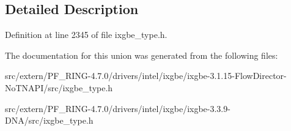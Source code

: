 \subsection{Detailed Description}


Definition at line 2345 of file ixgbe\_\-type.h.



The documentation for this union was generated from the following files:\begin{DoxyCompactItemize}
\item 
src/extern/PF\_\-RING-\/4.7.0/drivers/intel/ixgbe/ixgbe-\/3.1.15-\/FlowDirector-\/NoTNAPI/src/ixgbe\_\-type.h\item 
src/extern/PF\_\-RING-\/4.7.0/drivers/intel/ixgbe/ixgbe-\/3.3.9-\/DNA/src/ixgbe\_\-type.h\end{DoxyCompactItemize}
